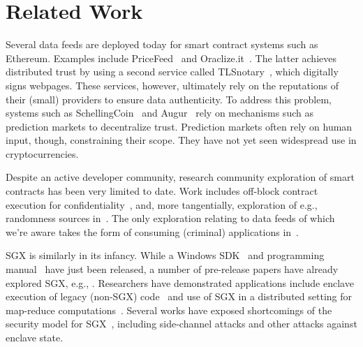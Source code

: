 \section{Related Work}

Several data feeds are deployed today for smart contract systems such as Ethereum. Examples include PriceFeed~\cite{PriceFeed:2016} and Oraclize.it~\cite{Oraclize:2016}. The latter achieves distributed trust by using a second service called TLSnotary~\cite{TLSnotary}, which digitally signs webpages. These services, however, ultimately rely on the reputations of their (small) providers to ensure data authenticity.  To address this problem, systems such as SchellingCoin~\cite{schellingcoin} and Augur~\cite{augur} rely on mechanisms such as prediction markets to decentralize trust. Prediction markets often rely on human input, though, constraining their scope. They have not yet seen widespread use in cryptocurrencies. 

Despite an active developer community, research community exploration of smart contracts has been very limited to date. Work includes off-block contract execution for confidentiality~\cite{hawk}, and, more tangentially, exploration of e.g., randomness sources in~\cite{bonneau2015bitcoin}. The only exploration relating to data feeds of which we're aware takes the form of consuming (criminal) applications in~\cite{}.

SGX is similarly in its infancy.
While a Windows SDK~\cite{sgxsdk} and programming manual~\cite{sgxmanual} have just been released, a number of pre-release papers have already explored SGX, e.g., \cite{Baumann:2015:SAU:2818727.2799647,7163017,7163052,anati2013innovative,McKeen:2013jv,Phegade:2013km}. Researchers have demonstrated applications include enclave execution of legacy (non-SGX) code~\cite{Haven} and use of SGX in a distributed setting for map-reduce computations~\cite{VC3}. Several works have exposed shortcomings of the security model for SGX~\cite{sgxexplained,sgxsok,shihardwaretalk}, including side-channel attacks and other attacks against enclave state. 


